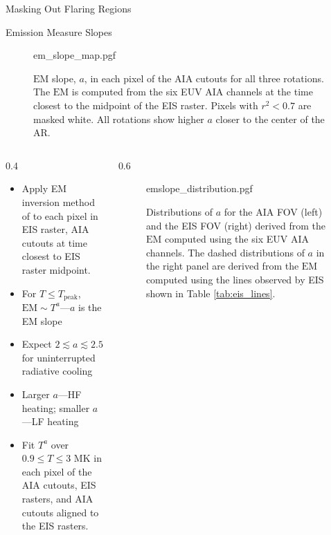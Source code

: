 \documentclass[final]{beamer}
\newlength{\colwidth}
\begin{document}
\begin{frame}[t]
\begin{columns}[t]
\begin{column}{\colwidth}
\begin{block}{Masking Out Flaring Regions}
  \end{block}

  \vspace{-35pt}

  \begin{block}{Emission Measure Slopes}

    \begin{figure}
      \centering
      {em_slope_map.pgf}
      \caption{$\mathrm{EM}$ slope, $a$, in each pixel of the AIA cutouts for all three rotations. The $\mathrm{EM}$ is computed from the six EUV AIA channels at the time closest to the midpoint of the EIS raster. Pixels with $r^2<0.7$ are masked white. All rotations show higher $a$ closer to the center of the AR.} 
      \label{fig:em_slope_map}
    \end{figure}

    \vspace{-35pt}

    \begin{columns}[c]
      \begin{column}{0.4\colwidth}
        \begin{itemize}
          \item Apply EM inversion method of \citet{hannah_differential_2012} to each pixel in EIS raster, AIA cutouts at time closest to EIS raster midpoint.
          \item For $T\le T_\mathrm{peak}$, $\mathrm{EM}\sim T^a$---$a$ is the \alert{EM slope} \citep{jordan_structure_1975}
          \item Expect $2\lesssim a\lesssim2.5$ for uninterrupted radiative cooling \citep{cargill_implications_1994}
          \item \alert{Larger $a$---HF heating; smaller $a$---LF heating}
          \item Fit $T^a$ over $0.9\le T\le 3$ MK in each pixel of the AIA cutouts, EIS rasters, and AIA cutouts aligned to the EIS rasters.
        \end{itemize}
      \end{column}
      \begin{column}{0.6\colwidth}
        \begin{figure}
          \centering
          {emslope_distribution.pgf}
          \caption{Distributions of $a$ for the AIA FOV (left) and the EIS FOV (right) derived from the $\mathrm{EM}$ computed using the six EUV AIA channels. The dashed distributions of $a$ in the right panel are derived from the $\mathrm{EM}$ computed using the lines observed by EIS shown in Table \autoref{tab:eis_lines}.} 
          \label{fig:emslope_distribution}
        \end{figure}
      \end{column}
    \end{columns}


\end{block}
\end{column}
\end{columns}
\end{frame}
\end{document}
